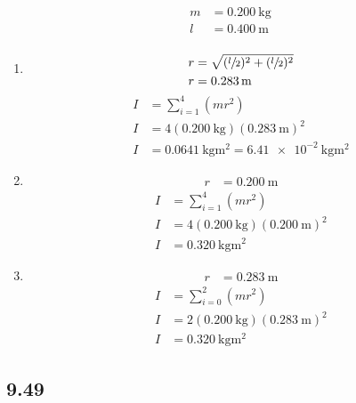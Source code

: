\documentclass{article}
\begin{document}
\begin{align*}
	m & = \SI{0.200}{\kilogram} \\
	l & = \SI{0.400}{\meter} \\
\end{align*}
\begin{enumerate}[label = \boldalpha]
	\item
		\begin{align*}
			r & = \sqrt{ (\sfrac{l}{2})^2 + (\sfrac{l}{2})^2 } \\
			r & = \SI{0.283}{\meter}
		\end{align*}
		\begin{align*}
			I & = \sum_{i = 1}^{4} (mr^2) \\
			I & = 4(\SI{0.200}{\kilogram})(\SI{0.283}{\meter})^2 \\
			I & = \SI{0.0641}{\kilogram \meter \squared} = \SI{6.41e-2}{\kilogram \meter \squared}
		\end{align*}
	\item
		\begin{align*}
			r & = \SI{0.200}{\meter}
		\end{align*}
		\begin{align*}
			I & = \sum_{i = 1}^{4} (mr^2) \\
			I & = 4(\SI{0.200}{\kilogram})(\SI{0.200}{\meter})^2 \\
			I & = \SI{0.320}{\kilogram \meter \squared}
		\end{align*}
	\item
		\begin{align*}
			r & = \SI{0.283}{\meter}
		\end{align*}
		\begin{align*}
			I & = \sum_{i = 0}^{2} (mr^2) \\
			I & = 2(\SI{0.200}{\kilogram})(\SI{0.283}{\meter})^2 \\
			I & = \SI{0.320}{\kilogram \meter \squared}
		\end{align*}
\end{enumerate}

\subsection{9.49}
\end{document}
